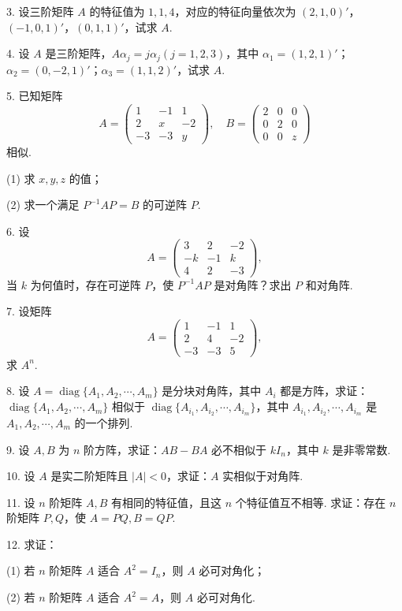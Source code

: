 \documentclass[UTF8,12pt,a4paper,fontset=fandol]{ctexart}
\begin{document}
3. 设三阶矩阵 $A$ 的特征值为 $1,1,4$，对应的特征向量依次为 $(2,1,0)'$，$(-1,0,1)'$，$(0,1,1)'$，试求 $A$.

4. 设 $A$ 是三阶矩阵，$A\alpha_j=j\alpha_j(j=1,2,3)$，其中 $\alpha_1=(1,2,1)'$；$\alpha_2=(0,-2,1)'$；$\alpha_3=(1,1,2)'$，试求 $A$.

5. 已知矩阵
\[
A=\left(\begin{array}{ccc}
1 & -1 & 1\\
2 & x & -2\\
-3 & -3 & y
\end{array}\right),\quad
B=\left(\begin{array}{ccc}
2 & 0 & 0\\
0 & 2 & 0\\
0 & 0 & z
\end{array}\right)
\]
相似.

(1) 求 $x,y,z$ 的值；

(2) 求一个满足 $P^{-1}AP=B$ 的可逆阵 $P$.

6. 设
\[
A=\left(\begin{array}{ccc}
3 & 2 & -2\\
-k & -1 & k\\
4 & 2 & -3
\end{array}\right),
\]
当 $k$ 为何值时，存在可逆阵 $P$，使 $P^{-1}AP$ 是对角阵？求出 $P$ 和对角阵.

7. 设矩阵
\[
A=\left(\begin{array}{ccc}
1 & -1 & 1\\
2 & 4 & -2\\
-3 & -3 & 5
\end{array}\right),
\]
求 $A^n$.

8. 设 $A=\operatorname{diag}\{A_1,A_2,\cdots,A_m\}$ 是分块对角阵，其中 $A_i$ 都是方阵，求证：$\operatorname{diag}\{A_1,A_2,\cdots,A_m\}$ 相似于 $\operatorname{diag}\{A_{i_1},A_{i_2},\cdots,A_{i_m}\}$，其中 $A_{i_1},A_{i_2},\cdots,A_{i_m}$ 是 $A_1,A_2,\cdots,A_m$ 的一个排列.

9. 设 $A,B$ 为 $n$ 阶方阵，求证：$AB-BA$ 必不相似于 $kI_n$，其中 $k$ 是非零常数.

10. 设 $A$ 是实二阶矩阵且 $|A|<0$，求证：$A$ 实相似于对角阵.

11. 设 $n$ 阶矩阵 $A,B$ 有相同的特征值，且这 $n$ 个特征值互不相等. 求证：存在 $n$ 阶矩阵 $P,Q$，使 $A=PQ,B=QP$.

12. 求证：

(1) 若 $n$ 阶矩阵 $A$ 适合 $A^2=I_n$，则 $A$ 必可对角化；

(2) 若 $n$ 阶矩阵 $A$ 适合 $A^2=A$，则 $A$ 必可对角化.
\end{document}
